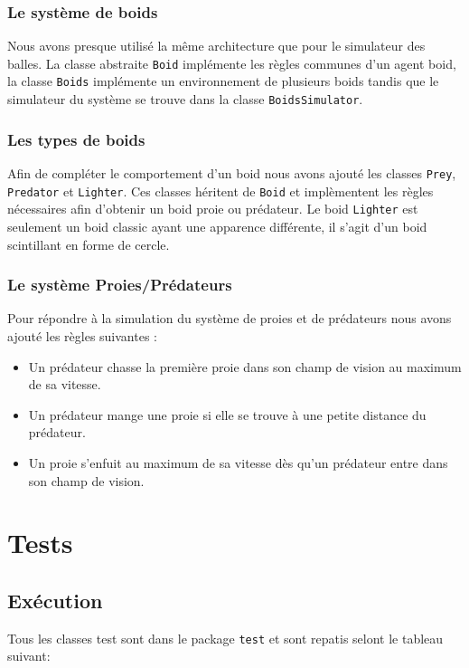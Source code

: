 \documentclass [a4paper,11pt,titlepage] {article}
\begin{document}
\subsubsection {Le système de boids}
Nous avons presque utilisé la même architecture que pour le simulateur des balles. La classe abstraite \texttt{Boid} implémente les règles communes d'un agent boid, la classe \texttt{Boids} implémente un environnement de plusieurs boids tandis que le simulateur du système se trouve dans la classe \texttt{BoidsSimulator}. 

\subsubsection {Les types de boids}

Afin de compléter le comportement d'un boid nous avons ajouté les classes \texttt{Prey}, \texttt{Predator} et \texttt{Lighter}. Ces classes héritent de \texttt{Boid} et implèmentent les règles nécessaires afin d'obtenir un boid proie ou prédateur. Le boid \texttt{Lighter} est seulement un boid classic ayant une apparence différente, il s'agit d'un boid scintillant en forme de cercle.

\subsubsection {Le système Proies/Prédateurs}

Pour répondre à la simulation du système de proies et de prédateurs nous avons ajouté les règles suivantes :
\begin{itemize}
\item Un prédateur chasse la première proie dans son champ de vision au maximum de sa vitesse.
\item Un prédateur mange une proie si elle se trouve à une petite distance du prédateur.
\item Un proie s'enfuit au maximum de sa vitesse dès qu'un prédateur entre dans son champ de vision.
\end{itemize}

\section {Tests}

\subsection {Exécution}
Tous les classes test sont dans le package \texttt{test} et sont repatis selont le tableau suivant:
\end{document}
